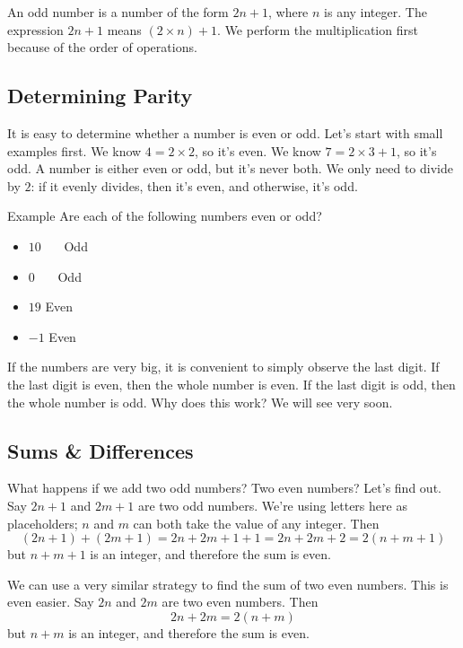 \documentclass[a4paper,10pt]{report}
\begin{document}
An odd number is a number of the form $2n+1$, where $n$ is any integer. The
expression $2n+1$ means $(2\times n) + 1$. We perform the multiplication first
because of the order of operations.

\subsection{Determining Parity}
It is easy to determine whether a number is even or odd. Let's start with small
examples first. We know $4=2\times2$, so it's even. We know $7=2\times3+1$, so
it's odd. A number is either even or odd, but it's never both. We only need to
divide by $2$: if it evenly divides, then it's even, and otherwise, it's odd.

\begin{problem}{Example}
 Are each of the following numbers even or odd?

 \begin{itemize}
  \item $10$ \hfill {}~~~Odd
  \item $0$ \hfill {}~~~Odd
  \item $19$ \hfill Even~~~
  \item $-1$ \hfill Even~~~
 \end{itemize}
\end{problem}

If the numbers are very big, it is convenient to simply observe the last digit.
If the last digit is even, then the whole number is even. If the last digit is
odd, then the whole number is odd. Why does this work? We will see very soon.

\subsection{Sums \& Differences}

What happens if we add two odd numbers? Two even numbers? Let's find out. Say
$2n+1$ and $2m+1$ are two odd numbers. We're using letters here as placeholders;
$n$ and $m$ can both take the value of any integer. Then \[
 (2n+1) + (2m+1) = 2n + 2m + 1 + 1 = 2n + 2m + 2 = 2(n+m+1)
\] but $n+m+1$ is an integer, and therefore the sum is even.

We can use a very similar strategy to find the sum of two even numbers. This is
even easier. Say $2n$ and $2m$ are two even numbers. Then \[
 2n + 2m = 2(n+m)
\] but $n+m$ is an integer, and therefore the sum is even.
\end{document}
